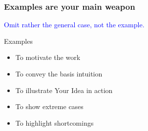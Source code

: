 \documentclass[aspectratio=43,10pt,ucs]{beamer} %
\begin{document}
\begin{frame}
  \frametitle{Examples are your main weapon}

  \textcolor{blue}{Omit rather the general case, not the example.}

  \vspace*{.5em}

  \alert{Examples}
  \begin{itemize}
  \item To motivate the work
  \item To convey the basis intuition
  \item To illustrate Your Idea in action
  \item To show extreme cases
  \item To highlight shortcomings
  \end{itemize}

  \vspace*{.5em}

\end{frame}
\end{document}

